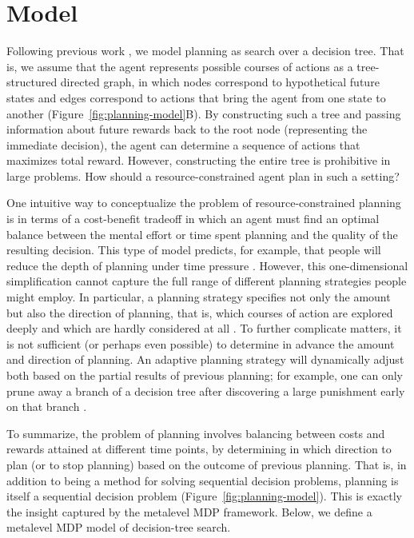 \section{Model}\label{sec:planning-model}

Following previous work \citep{huys2012bonsai,huys2015interplay,vanopheusden2017computational,sezener2019optimizing}, we model planning as search over a decision tree. That is, we assume that the agent represents possible courses of actions as a tree-structured directed graph, in which nodes correspond to hypothetical future states and edges correspond to actions that bring the agent from one state to another (Figure~\ref{fig:planning-model}B). By constructing such a tree and passing information about future rewards back to the root node (representing the immediate decision), the agent can determine a sequence of actions that maximizes total reward. However, constructing the entire tree is prohibitive in large problems. How should a resource-constrained agent plan in such a setting?

One intuitive way to conceptualize the problem of resource-constrained planning is in terms of a cost-benefit tradeoff \citep{daw2005uncertaintybased,keramati2011speed,shenhav2013expected,kool2017costbenefit,kool2018mental} in which an agent must find an optimal balance between the mental effort or time spent planning and the quality of the resulting decision. This type of model predicts, for example, that people will reduce the depth of planning under time pressure \citep{keramati2016adaptive}. However, this one-dimensional simplification cannot capture the full range of different planning strategies people might employ. In particular, a planning strategy specifies not only the amount but also the direction of planning, that is, which courses of action are explored deeply and which are hardly considered at all \citep{sezener2019optimizing}. To further complicate matters, it is not sufficient (or perhaps even possible) to determine in advance the amount and direction of planning. An adaptive planning strategy will dynamically adjust both based on the partial results of previous planning; for example, one can only prune away a branch of a decision tree after discovering a large punishment early on that branch \citep{huys2012bonsai}.

To summarize, the problem of planning involves balancing between costs and rewards attained at different time points, by determining in which direction to plan (or to stop planning) based on the outcome of previous planning. That is, in addition to being a method for solving sequential decision problems, planning is itself a sequential decision problem (Figure~\ref{fig:planning-model}). This is exactly the insight captured by the metalevel MDP framework. Below, we define a metalevel MDP model of decision-tree search.

